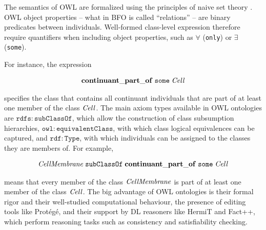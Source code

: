  
The semantics of OWL are formalized using the principles of naive set theory . OWL object properties -- what in BFO is called ``relations'' -- are binary predicates between individuals. %
Well-formed class-level expression therefore require quantifiers when including object properties, such as $\forall$ (\texttt{only}) or $\exists$ (\texttt{some}).


For instance, the expression 

\begin{equation}
\begin{split}
\mathrm{\mathbf{continuant\_part\_of}}\;\mathtt{some}\;\mathit{Cell}
\end{split}
\label{eq:cellquant}
\end{equation}

specifies the class that contains all continuant individuals
that are part of at least one member of the class $\mathit{Cell}$.
The main axiom types available in OWL ontologies are $\mathtt{rdfs:subClassOf}$, which allow the construction of class subsumption hierarchies,
$\mathtt{owl:equivalentClass}$, with which class logical equivalences can be captured, and $\mathtt{rdf:Type}$, with which individuals can be assigned to the classes they are members of.
For example, 

\begin{equation}
\begin{split}
\mathit{CellMembrane}\;\mathtt{subClassOf}\;\mathrm{\mathbf{continuant\_part\_of}}\;\mathtt{some}\;\mathit{Cell}
\end{split}
\label{eq:cellmdef}
\end{equation}

means that every member of the class $\mathit{CellMembrane}$ is
part of at least one member of the class $\mathit{Cell}$.
The big advantage of OWL ontologies is their formal rigor and their well-studied computational behaviour,
the presence of editing tools like Prot\'eg\'e,
and their support by DL reasoners like HermiT and Fact++, which perform
reasoning tasks such as consistency and satisfiability checking.
